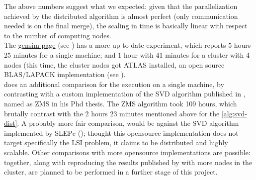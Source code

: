 The above numbers suggest what we expected: given that the
parallelization achieved by the distributed algorithm is almost
perfect (only communication needed is on the final merge), the scaling
in time is basically linear with respect to the number of computing
nodes. \\

The \href{https://radimrehurek.com/gensim/dist_lsi.html}{gensim page}
(see \cite{gensim}) has a more up to date
experiment, which reports $5$ hours 25 minutes for a single machine;
and $1$ hour with 41 minutes for a cluster with 4 nodes (this time,
the cluster nodes got ATLAS installed, an open source BLAS/LAPACK
implementation (see \cite{atlas}). \\

\Rehurek does an additional comparison for the execution on a single
machine, by contrasting with a custom implementation of the SVD
algorithm published in \cite{zha98}, named as ZMS in his Phd
thesis. The ZMS algorithm took 109 hours, which brutally contrast with
the 2 hours 23 minutes mentioned above for the \cref{alg:svd-dist}. A
probably more fair comparison, would be against the SVD algorithm
implemented by SLEPc (\cite{hernandez07}); thought this opensource
implementation does not target specifically the LSI problem, it claims
to be distributed and highly scalable. Other comparisons with more
opensource implementations are possible: together, along with
reproducing the results published by \Rehurek with more nodes in the
cluster, are planned to be performed in a further stage of this
project. 
